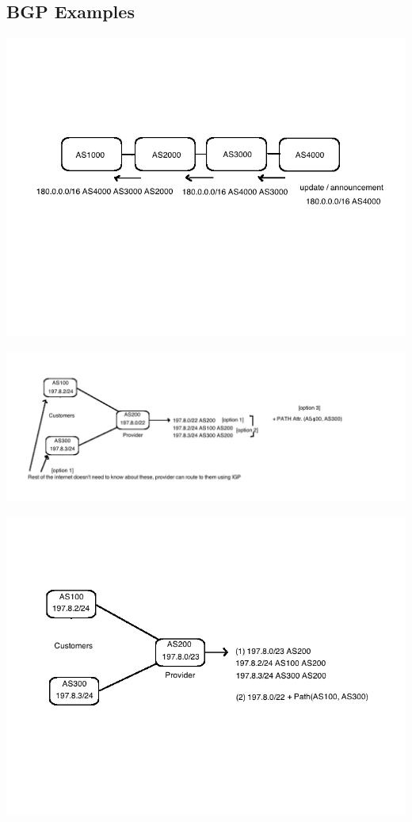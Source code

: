 \documentclass[11pt]{article}
\begin{document}
\subsection{BGP Examples}
\label{sec:orgheadline98}

\includegraphics[width=.9\linewidth]{diagrams/bgp2.png}


\includegraphics[width=.9\linewidth]{diagrams/bgp3.png}


\includegraphics[width=.9\linewidth]{diagrams/bgp4.png}
\end{document}
